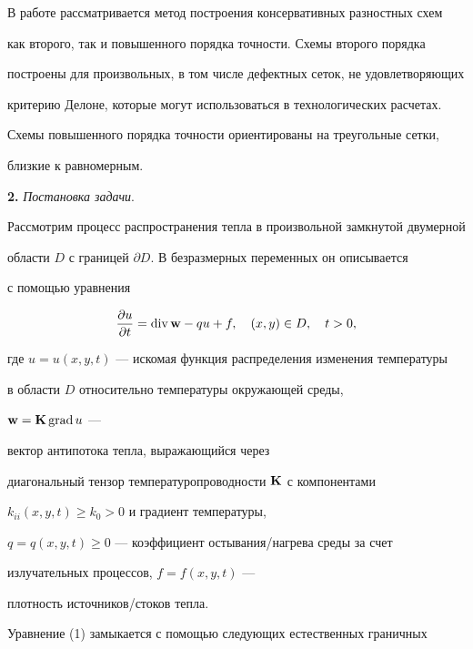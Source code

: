 В работе рассматривается метод построения консервативных разностных схем


как второго, так и повышенного порядка точности. Схемы второго порядка


построены для произвольных, в том числе дефектных сеток, не удовлетворяющих


критерию Делоне, которые могут использоваться в технологических расчетах.


Схемы повышенного порядка точности ориентированы на треугольные сетки,


близкие к равномерным.


\medskip





{\bf 2.} {\it Постановка задачи}.


Рассмотрим процесс распространения тепла в произвольной замкнутой двумерной


области $D$ с границей $\partial D$. В безразмерных переменных он описывается


с помощью уравнения


\begin{equation}


\lEq{1}


\frac{\partial u}{\partial t} =


\diver{\bold w} - q u + f, \quad (x,y) \in D, \quad t>0,


\end{equation}


где $u=u(x,y,t)$ --- искомая функция распределения изменения температуры


в области $D$ относительно температуры окружающей среды,


${\bold w}={\bold K}\operatorname{grad} u$ ---


вектор антипотока тепла, выражающийся через


диагональный тензор температуропроводности ${\bold K}$ с компонентами


$k_{ii}(x,y,t)\ge k_0>0$ и градиент температуры,


$q=q(x,y,t)\ge 0$ --- коэффициент остывания/нагрева среды за счет


излучательных процессов, $f=f(x,y,t)$ ---


плотность источников/стоков тепла.





Уравнение (1) замыкается с помощью следующих естественных граничных


